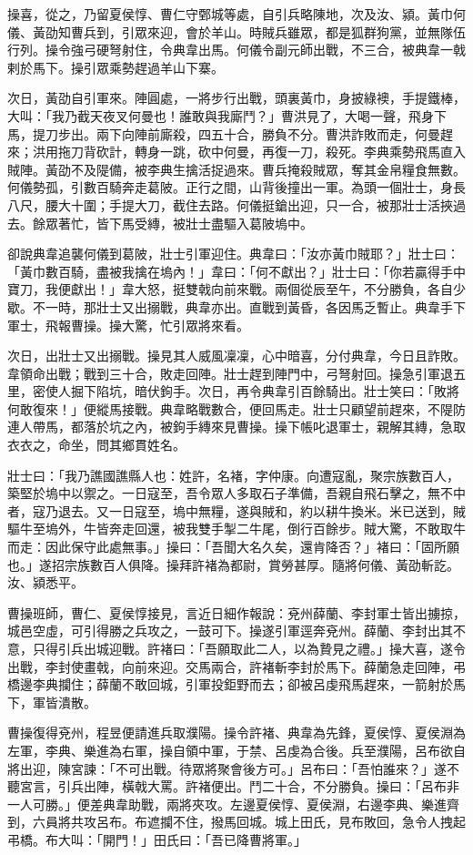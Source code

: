 操喜，從之，乃留夏侯惇、曹仁守鄄城等處，自引兵略陳地，次及汝、潁。黃巾何儀、黃劭知曹兵到，引眾來迎，會於羊山。時賊兵雖眾，都是狐群狗黨，並無隊伍行列。操令強弓硬弩射住，令典韋出馬。何儀令副元師出戰，不三合，被典韋一戟剌於馬下。操引眾乘勢趕過羊山下寨。

次日，黃劭自引軍來。陣圓處，一將步行出戰，頭裏黃巾，身披綠襖，手提鐵棒，大叫：「我乃截天夜叉何曼也！誰敢與我廝鬥？」曹洪見了，大喝一聲，飛身下馬，提刀步出。兩下向陣前廝殺，四五十合，勝負不分。曹洪詐敗而走，何曼趕來；洪用拖刀背砍計，轉身一跳，砍中何曼，再復一刀，殺死。李典乘勢飛馬直入賊陣。黃劭不及隄備，被李典生擒活捉過來。曹兵掩殺賊眾，奪其金帛糧食無數。何儀勢孤，引數百騎奔走葛陂。正行之間，山背後撞出一軍。為頭一個壯士，身長八尺，腰大十圍；手提大刀，截住去路。何儀挺鎗出迎，只一合，被那壯士活挾過去。餘眾著忙，皆下馬受縳，被壯士盡驅入葛陂塢中。

卻說典韋追襲何儀到葛陂，壯士引軍迎住。典韋曰：「汝亦黃巾賊耶？」壯士曰：「黃巾數百騎，盡被我擒在塢內！」韋曰：「何不獻出？」壯士曰：「你若贏得手中寶刀，我便獻出！」韋大怒，挺雙戟向前來戰。兩個從辰至午，不分勝負，各自少歇。不一時，那壯士又出搦戰，典韋亦出。直戰到黃昏，各因馬乏暫止。典韋手下軍士，飛報曹操。操大驚，忙引眾將來看。

次日，出壯士又出搦戰。操見其人威風凜凜，心中暗喜，分付典韋，今日且詐敗。韋領命出戰；戰到三十合，敗走回陣。壯士趕到陣門中，弓弩射回。操急引軍退五里，密使人掘下陷坑，暗伏鉤手。次日，再令典韋引百餘騎出。壯士笑曰：「敗將何敢復來！」便縱馬接戰。典韋略戰數合，便回馬走。壯士只顧望前趕來，不隄防連人帶馬，都落於坑之內，被鉤手縳來見曹操。操下帳叱退軍士，親解其縳，急取衣衣之，命坐，問其鄉貫姓名。

壯士曰：「我乃譙國譙縣人也：姓許，名褚，字仲康。向遭寇亂，聚宗族數百人，築堅於塢中以禦之。一日寇至，吾令眾人多取石子準備，吾親自飛石擊之，無不中者，寇乃退去。又一日寇至，塢中無糧，遂與賊和，約以耕牛換米。米已送到，賊驅牛至塢外，牛皆奔走回還，被我雙手掣二牛尾，倒行百餘步。賊大驚，不敢取牛而走：因此保守此處無事。」操曰：「吾聞大名久矣，還肯降否？」褚曰：「固所願也。」遂招宗族數百人俱降。操拜許褚為都尉，賞勞甚厚。隨將何儀、黃劭斬訖。汝、潁悉平。

曹操班師，曹仁、夏侯惇接見，言近日細作報說：兗州薛蘭、李封軍士皆出擄掠，城邑空虛，可引得勝之兵攻之，一鼓可下。操遂引軍逕奔兗州。薛蘭、李封出其不意，只得引兵出城迎戰。許褚曰：「吾願取此二人，以為贄見之禮。」操大喜，遂令出戰，李封使畫戟，向前來迎。交馬兩合，許褚斬李封於馬下。薛蘭急走回陣，弔橋邊李典攔住；薛蘭不敢回城，引軍投鉅野而去；卻被呂虔飛馬趕來，一箭射於馬下，軍皆潰散。

曹操復得兗州，程昱便請進兵取濮陽。操令許褚、典韋為先鋒，夏侯惇、夏侯淵為左軍，李典、樂進為右軍，操自領中軍，于禁、呂虔為合後。兵至濮陽，呂布欲自將出迎，陳宮諫：「不可出戰。待眾將聚會後方可。」呂布曰：「吾怕誰來？」遂不聽宮言，引兵出陣，橫戟大罵。許褚便出。鬥二十合，不分勝負。操曰：「呂布非一人可勝。」便差典韋助戰，兩將夾攻。左邊夏侯惇、夏侯淵，右邊李典、樂進齊到，六員將共攻呂布。布遮攔不住，撥馬回城。城上田氏，見布敗回，急令人拽起弔橋。布大叫：「開門！」田氏曰：「吾已降曹將軍。」


